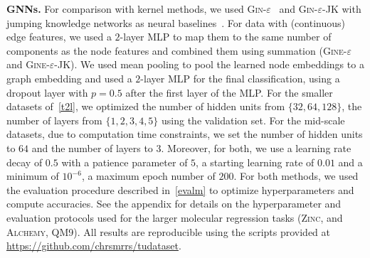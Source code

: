 \documentclass{article}
\newcommand{\xhdr}[1]{{\noindent\bfseries #1}}
\theoremstyle{definition}
\begin{document}
\xhdr{GNNs.} 
For comparison with kernel methods, we used \textsc{Gin-$\varepsilon$}~\cite{Xu+2018b} and \textsc{Gin-$\varepsilon$-JK} with jumping knowledge networks as neural baselines~\cite{Xu+2018}. For data with (continuous) edge features, we used a $2$-layer MLP to map them to the same number of components as the node features and combined them using summation (\textsc{Gine-$\varepsilon$} and \textsc{Gine-$\varepsilon$}-JK). We used mean pooling to pool the learned node embeddings to a graph embedding and used a $2$-layer MLP for the final classification, using a dropout layer with $p = 0.5$ after the first layer of the MLP. For the smaller datasets of~\cref{t2l}, we optimized the number of hidden units from $
\{ 32, 64, 128\}$, the number of layers from $ \{1, 2, 3, 4, 5\}$ using the validation set. For the mid-scale datasets, due to computation time constraints, we set the number of hidden units to $64$ and the number of layers to $3$. Moreover, for both, we use a learning rate decay of $0.5$ with a patience parameter of $5$, a starting learning rate of $0.01$ and a minimum of $10^{-6}$, a maximum epoch number of $200$. For both methods, we used the evaluation procedure described in~\cref{evalm} to optimize hyperparameters and compute accuracies. See the appendix for details on the hyperparameter and evaluation protocols used for the larger molecular regression tasks (\textsc{Zinc}, and \textsc{Alchemy}, \textsc{QM9}). All results are reproducible using the scripts provided at \url{https://github.com/chrsmrrs/tudataset}.
\end{document}
